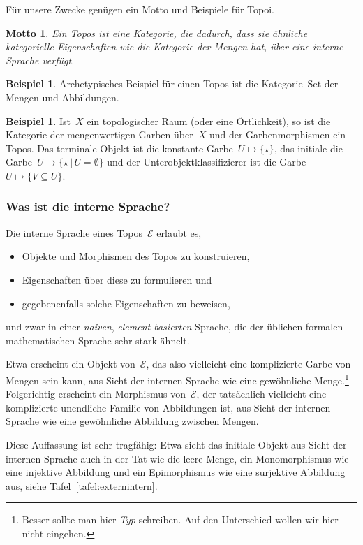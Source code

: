 \documentclass[a4paper,ngerman,12pt]{scrartcl}
\theoremstyle{definition}
\newtheorem{bsp}[defn]{Beispiel}
\theoremstyle{plain}
\newtheorem{motto}[defn]{Motto}
\theoremstyle{remark}
\newcommand{\E}{\mathcal{E}}
\newcommand{\Set}{\mathrm{Set}}
\renewcommand{\_}{\mathpunct{.}\,}
\newcommand{\?}{\,{:}\,}
\begin{document}
Für unsere Zwecke genügen ein Motto und Beispiele für Topoi.

\begin{motto}Ein Topos ist eine Kategorie, die dadurch, dass sie ähnliche
kategorielle Eigenschaften wie die Kategorie der Mengen hat, über eine
\emph{interne Sprache} verfügt.\end{motto}

\begin{bsp}Archetypisches Beispiel für einen Topos ist die Kategorie~$\Set$ der
Mengen und Abbildungen.
\end{bsp}

\begin{bsp}Ist~$X$ ein topologischer Raum (oder eine Örtlichkeit), so ist die
Kategorie der mengenwertigen Garben über~$X$ und der Garbenmorphismen ein
Topos. Das terminale Objekt ist die konstante Garbe~$U \mapsto \{ \star \}$,
das initiale die Garbe~$U \mapsto \{ \star \,|\, U = \emptyset \}$ und der
Unterobjektklassifizierer ist die Garbe~$U \mapsto \{ V \subseteq U \}$.
\end{bsp}


\subsubsection*{Was ist die interne Sprache?}

Die interne Sprache eines Topos~$\E$ erlaubt es,
\begin{itemize}
\item Objekte und Morphismen des Topos zu konstruieren,
\item Eigenschaften über diese zu formulieren und
\item gegebenenfalls solche Eigenschaften zu beweisen,
\end{itemize}
und zwar in einer \emph{naiven}, \emph{element-basierten} Sprache, die der
üblichen formalen mathematischen Sprache sehr stark ähnelt.

Etwa erscheint ein Objekt von~$\E$, das also vielleicht eine komplizierte Garbe
von Mengen sein kann, aus Sicht der internen Sprache wie eine gewöhnliche
Menge.\footnote{Besser sollte man hier \emph{Typ} schreiben. Auf den
Unterschied wollen wir hier nicht eingehen.} Folgerichtig erscheint ein
Morphismus von~$\E$, der tatsächlich vielleicht eine komplizierte unendliche
Familie von Abbildungen ist, aus Sicht der internen Sprache wie eine
gewöhnliche Abbildung zwischen Mengen.

Diese Auffassung ist sehr tragfähig: Etwa sieht das initiale Objekt aus Sicht
der internen Sprache auch in der Tat wie die leere Menge, ein Monomorphismus
wie eine injektive Abbildung und ein Epimorphismus wie eine surjektive
Abbildung aus, siehe Tafel~\ref{tafel:externintern}.
\end{document}
